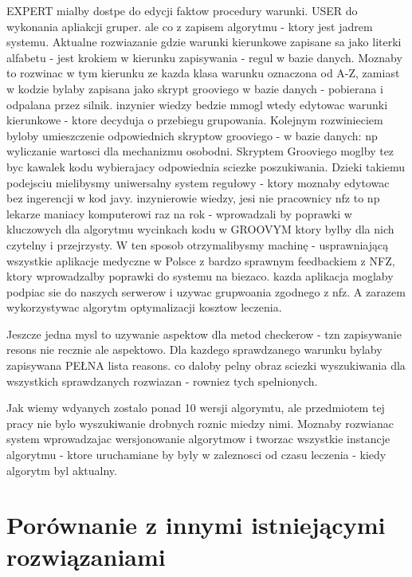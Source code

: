 EXPERT mialby dostpe do edycji faktow procedury warunki. USER do wykonania apliakcji gruper. ale co z zapisem algorytmu - ktory jest jadrem systemu. Aktualne rozwiazanie gdzie warunki kierunkowe zapisane sa jako literki alfabetu - jest krokiem w kierunku zapisywania - regul w bazie danych. Moznaby to rozwinac w tym kierunku ze kazda klasa warunku oznaczona od A-Z, zamiast w kodzie bylaby zapisana jako skrypt grooviego w bazie danych - pobierana i odpalana przez silnik. inzynier wiedzy bedzie mmogl wtedy edytowac warunki kierunkowe - ktore decyduja o przebiegu grupowania. Kolejnym rozwinieciem byloby umieszczenie odpowiednich skryptow grooviego - w bazie danych: np wyliczanie wartosci dla mechanizmu osobodni. Skryptem Grooviego moglby tez byc kawalek kodu wybierajacy odpowiednia sciezke poszukiwania. Dzieki takiemu podejsciu mielibysmy uniwersalny system regułowy - ktory moznaby edytowac bez ingerencji w kod javy. inzynierowie wiedzy, jesi nie pracownicy nfz to np lekarze maniacy komputerowi raz na rok - wprowadzali by poprawki w kluczowych dla algorytmu wycinkach kodu w GROOVYM ktory bylby dla nich czytelny i przejrzysty. W ten sposob otrzymalibysmy machinę - usprawniającą wszystkie aplikacje medyczne w Polsce z bardzo sprawnym feedbackiem z NFZ, ktory wprowadzalby poprawki do systemu na biezaco. kazda aplikacja moglaby podpiac sie do naszych serwerow i uzywac grupwoania zgodnego z nfz. A zarazem wykorzystywac algorytm optymalizacji kosztow leczenia.

Jeszcze jedna mysl to uzywanie aspektow dla metod checkerow - tzn zapisywanie resons nie recznie ale aspektowo. Dla kazdego sprawdzanego warunku bylaby zapisywana PEŁNA lista reasons. co daloby pelny obraz sciezki wyszukiwania dla wszystkich sprawdzanych rozwiazan - rowniez tych spelnionych.

Jak wiemy wdyanych zostalo ponad 10 wersji algorymtu, ale przedmiotem tej pracy nie bylo wyszukiwanie drobnych roznic miedzy nimi. Moznaby rozwianac system wprowadzajac wersjonowanie algorytmow i tworzac wszystkie instancje algorytmu - ktore uruchamiane by byly w zaleznosci od czasu leczenia - kiedy algorytm byl aktualny.



\section{Porównanie z innymi istniejącymi rozwiązaniami}
\label{sec:porownanieZinnymiRozwiazaniami}

